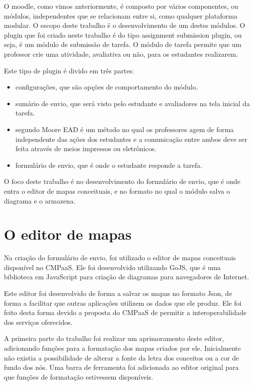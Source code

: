 \documentclass[
	12pt,				%
	openright,			%
	oneside,			%
	a4paper,			%
	english,			%
	french,				%
	spanish,			%
	brazil				%
	]{abntex2}
\begin{document}
O moodle, como vimos anteriormente, é composto por vários componentes, ou módulos, independentes que se relacionam entre si, como qualquer plataforma modular. O escopo deste trabalho é o desenvolvimento de um destes módulos. O plugin que foi criado neste trabalho é do tipo assignment submission plugin, ou seja, é um módulo de submissão de tarefa. O módulo de tarefa permite que um professor crie uma atividade, avaliativa ou não, para os estudantes realizarem.

Este tipo de plugin é divido em três partes:
\begin{itemize}
	\item configurações, que são opções de comportamento do módulo.
	\item sumário de envio, que será visto pelo estudante e avaliadores na tela inicial da tarefa.
	\item segundo Moore EAD é um método no qual os professores agem de forma independente das ações dos estudantes e a comunicação entre ambos deve ser feita através de meios impressos ou eletrônicos.
	\item formulário de envio, que é onde o estudante responde a tarefa.  
\end{itemize} 

O foco deste trabalho é no desenvolvimento do formulário de envio, que é onde entra o editor de mapas conceituais, e no formato no qual o módulo salva o diagrama e o armazena. 

\section{O editor de mapas}
Na criação do formulário de envio, foi utilizado o editor de mapas conceituais disponível no CMPaaS. Ele foi desenvolvido utilizando GoJS, que é uma biblioteca em JavaScript para criação de diagramas para navegadores de Internet.

Este editor foi desenvolvido de forma a salvar os mapas no formato Json, de forma a facilitar que outras aplicações utilizem os dados que ele produz. Ele foi feito desta forma devido a proposta do CMPaaS de permitir a interoperabilidade dos serviços oferecidos.

A primeira parte do trabalho foi realizar um aprimoramento deste editor, adicionando funções para a formatação dos mapas criados por ele. Inicialmente não existia a possibilidade de alterar a fonte da letra dos conceitos ou a cor de fundo dos nós. Uma barra de ferramenta foi adicionada ao editor original para que funções de formatação estivessem disponíveis.
\end{document}
